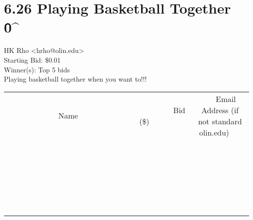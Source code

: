 \documentclass[11pt]{article}
\begin{document}
					\section*{6.26 Playing Basketball Together \^0\^}
					HK Rho <hrho@olin.edu> \\
					Starting Bid: \$0.01 \\
					Winner(s): Top 5 bids \\
					Playing basketball together when you want to!!! \\
					[6ex]
					\begin{tabular}{c c c}
						~~~~~~~~~~~~~Name~~~~~~~~~~~~~ & ~~~~~~~~~Bid (\$)~~~~~~~~~ & ~~~Email Address (if not standard olin.edu)~~~ \\
				
 & & \\
\hline
 & & \\
\hline
 & & \\
\hline
 & & \\
\hline
 & & \\
\hline
 & & \\
\hline
 & & \\
\hline
 & & \\
\hline
 & & \\
\hline
 & & \\
\hline
 & & \\
\hline
 & & \\
\hline
 & & \\
\hline
 & & \\
\hline
 & & \\
\hline
 & & \\
\hline
 & & \\
\hline
 & & \\
\hline
 & & \\
\hline
 & & \\
\hline
 & & \\
\hline
 & & \\
\hline
 & & \\
\hline
 & & \\
\hline
 & & \\
\hline
 & & \\
\hline
					\end{tabular}
					\clearpage
				
\end{document}
